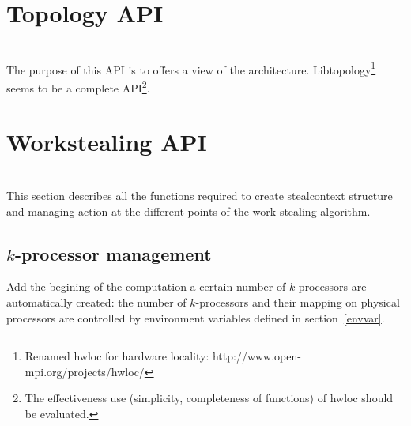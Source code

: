 \documentclass[12pt]{report}
\begin{document}
\section{Topology API}
\\

The purpose of this API is to offers a view of the architecture. Libtopology\footnote{Renamed hwloc for hardware locality: http://www.open-mpi.org/projects/hwloc/} seems to be a complete API\footnote{The effectiveness use (simplicity, completeness of functions) of hwloc should be evaluated.}.

\section{Workstealing API}
\\

This section describes all the functions required to create stealcontext structure and managing action at the different points of the work stealing algorithm.


\subsection{$k$-processor management}

Add the begining of the computation a certain number of $k$-processors are automatically created: the number of $k$-processors and their mapping on physical processors are controlled by environment variables defined in section~\ref{envvar}.
\end{document}
